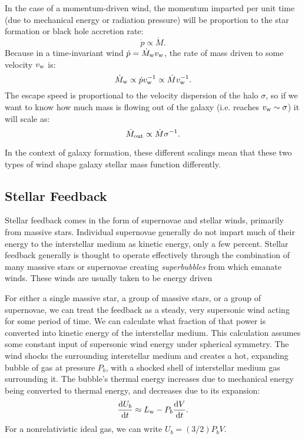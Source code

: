 In the case of a momentum-driven wind, the momentum imparted per unit
time (due to mechanical energy or radiation pressure) will be
proportion to the star formation or black hole accretion rate:
\begin{equation}
\dot p \propto \dot M.
\end{equation}
Because in a time-invariant wind $\dot p = \dot M_{\rm w} v_{\rm w}$,
the rate of mass driven to some velocity $v_{\rm w}$ is:
\begin{equation}
\dot M_{\rm w} \propto \dot p v_{\rm w}^{-1} \propto \dot M v_{\rm
  w}^{-1}.
\end{equation}
The escape speed is proportional to the velocity dispersion of the
halo $\sigma$, so if we want to know how much mass is flowing out of
the galaxy (i.e. reaches $v_{\rm w} \sim \sigma$) it will scale as:
\begin{equation}
\dot M_{\rm out} \propto \dot M \sigma^{-1}.
\end{equation}

In the context of galaxy formation, these different scalings mean that
these two types of wind shape galaxy stellar mass function
differently.

\subsection{Stellar Feedback}

Stellar feedback comes in the form of supernovae and stellar winds,
primarily from massive stars. Individual supernovae generally do not
impart much of their energy to the interstellar medium as kinetic
energy, only a few percent. Stellar feedback generally is thought to
operate effectively through the combination of many massive stars or
supernovae creating {\it superbubbles} from which emanate winds. These
winds are usually taken to be energy driven

For either a single massive star, a group of massive stars, or a group
of supernovae, we can treat the feedback as a steady, very supersonic
wind acting for some period of time. We can calculate what fraction of
that power is converted into kinetic energy of the interstellar
medium. This calculation assumes some constant input of supersonic
wind energy under spherical symmetry. The wind shocks the surrounding
interstellar medium and creates a hot, expanding bubble of gas at
pressure $P_b$, with a shocked shell of interstellar medium gas
surrounding it. The bubble's thermal energy increases due to
mechanical energy being converted to thermal energy, and decreases due
to its expansion:
\begin{equation}
\label{eq:energy-bubble}
\frac{{\rm d}U_b}{{\rm d}t} \approx L_{\rm w} - P_b \frac{{\rm
    d}V}{{\rm d}t}.
\end{equation}
For a nonrelativistic ideal gas, we can write $U_b = (3/2) P_b V$.

